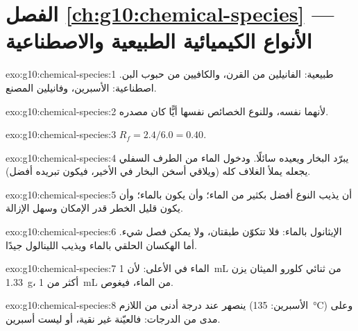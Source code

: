 \section*{الفصل \ref{ch:g10:chemical-species} --- الأنواع الكيميائية الطبيعية والاصطناعية}

\begin{solution}{exo:g10:chemical-species:1}
طبيعية: الفانيلين من القرن، والكافيين من حبوب البن. اصطناعية: الأسبرين،
وفانيلين المصنع.
\end{solution}

\begin{solution}{exo:g10:chemical-species:2}
لأنهما  نفسه، وللنوع الخصائص نفسها أيًّا كان
مصدره.
\end{solution}

\begin{solution}{exo:g10:chemical-species:3}
$R_f = 2.4/6.0 = 0.40$.
\end{solution}

\begin{solution}{exo:g10:chemical-species:4}
يبرّد البخار ويعيده سائلًا. ودخول الماء من الطرف السفلي يجعله يملأ الغلاف كله
(ويلاقي أسخن البخار في الأخير، فيكون تبريده
أفضل).
\end{solution}

\begin{solution}{exo:g10:chemical-species:5}
أن يذيب النوع أفضل بكثير من الماء؛ وأن يكون  بالماء؛ وأن
يكون قليل الخطر قدر الإمكان وسهل الإزالة.
\end{solution}

\begin{solution}{exo:g10:chemical-species:6}
الإيثانول  بالماء: فلا تتكوّن طبقتان، ولا يمكن فصل شيء. أما
الهكسان الحلقي  بالماء ويذيب اللينالول جيدًا.
\end{solution}

\begin{solution}{exo:g10:chemical-species:7}
الماء في الأعلى: لأن \qty{1}{mL} من ثنائي كلورو الميثان يزن \qty{1.33}{g}،
أكثر من \qty{1}{mL} من الماء، فيغوص.
\end{solution}

\begin{solution}{exo:g10:chemical-species:8}
ينصهر عند درجة أدنى من اللازم (الأسبرين: \qty{135}{\celsius}) وعلى مدى من
الدرجات: فالعيّنة غير نقية، أو ليست أسبرين.
\end{solution}

